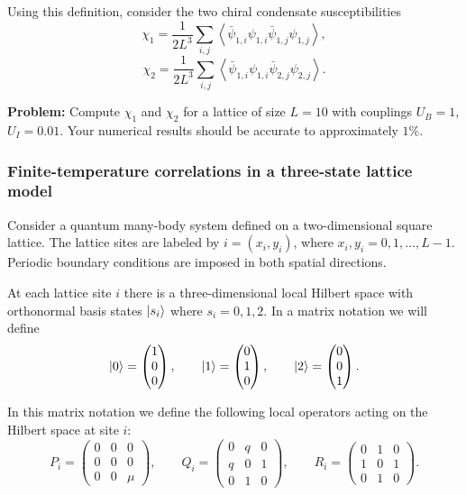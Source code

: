 Using this definition, consider the two chiral condensate susceptibilities
\begin{equation}
\chi_1
=
\frac{1}{2L^3}
\sum_{i,j}
\left\langle
\bar{\psi}_{1,i}\psi_{1,i}
\bar{\psi}_{1,j}\psi_{1,j}
\right\rangle,
\tag{6}
\end{equation}
\begin{equation}
\chi_2
=
\frac{1}{2L^3}
\sum_{i,j}
\left\langle
\bar{\psi}_{1,i}\psi_{1,i}
\bar{\psi}_{2,j}\psi_{2,j}
\right\rangle.
\tag{7}
\end{equation}

\textbf{Problem:} Compute $\chi_1$ and $\chi_2$ for a lattice of size $L=10$ with couplings $U_B=1$, $U_I=0.01$. Your numerical results should be accurate to approximately $1\%$.

\subsubsection{Finite-temperature correlations in a three-state lattice model}
\label{problem:three-state-correlations}
Consider a quantum many-body system defined on a two-dimensional square lattice. 
The lattice sites are labeled by $i=(x_i,y_i)$, where
$x_i,y_i=0,1,\ldots,L-1$. Periodic boundary conditions are imposed in both
spatial directions.

At each lattice site $i$ there is a three-dimensional local Hilbert space with
orthonormal basis states $\ket{s_i}$ where $s_i=0,1,2$. In a matrix notation we
will define
\[
\ket{0}=
\begin{pmatrix}
1\\
0\\
0
\end{pmatrix},
\qquad
\ket{1}=
\begin{pmatrix}
0\\
1\\
0
\end{pmatrix},
\qquad
\ket{2}=
\begin{pmatrix}
0\\
0\\
1
\end{pmatrix}.
\]

In this matrix notation we define the following local operators acting on the
Hilbert space at site $i$:
\[
P_i=
\begin{pmatrix}
0 & 0 & 0\\
0 & 0 & 0\\
0 & 0 & \mu
\end{pmatrix},
\qquad
Q_i=
\begin{pmatrix}
0 & q & 0\\
q & 0 & 1\\
0 & 1 & 0
\end{pmatrix},
\qquad
R_i=
\begin{pmatrix}
0 & 1 & 0\\
1 & 0 & 1\\
0 & 1 & 0
\end{pmatrix}.
\tag{8}
\]

